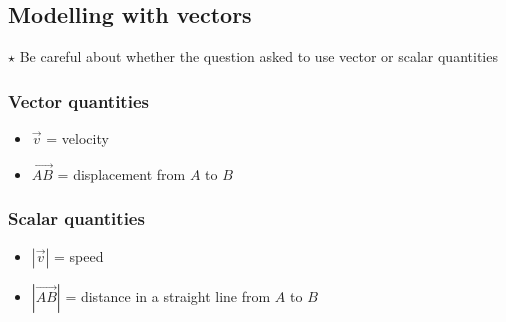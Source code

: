 \documentclass[A4paper]{article}
\begin{document}
	\subsection{Modelling with vectors}
	$\star$ Be careful about whether the question asked to use vector or scalar quantities
	\subsubsection{Vector quantities}
	\begin{itemize}
		\item $\vec{v}$ = velocity
		\item $\overrightarrow{AB}$ = displacement from $A$ to $B$
	\end{itemize}
	
	\subsubsection{Scalar quantities}
	\begin{itemize}
		\item $|\vec{v}|$ = speed
		\item $|\overrightarrow{AB}|$ = distance in a straight line from $A$ to $B$
	\end{itemize}
	
	
	
	
	
\end{document}
